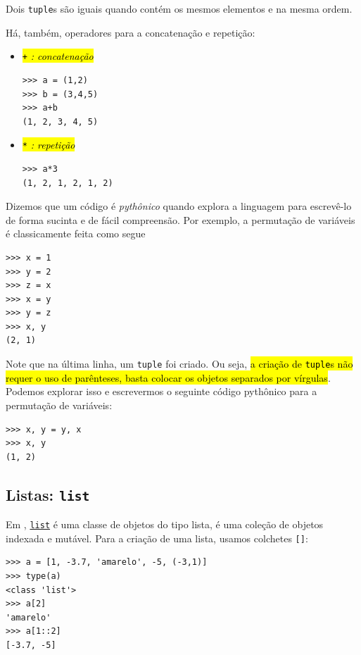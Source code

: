 \begin{obs}
  Dois \lstinline+tuple+s são iguais quando contém os mesmos elementos e na mesma ordem.
\end{obs}

Há, também, operadores para a concatenação e repetição:
\begin{itemize}
\item \hl{{\lstinline!+!} \emph{: concatenação}}

\begin{lstlisting}
>>> a = (1,2)
>>> b = (3,4,5)
>>> a+b
(1, 2, 3, 4, 5)
\end{lstlisting}

\item \hl{{\lstinline!*!} \emph{: repetição}}

\begin{lstlisting}
>>> a*3
(1, 2, 1, 2, 1, 2)
\end{lstlisting}
\end{itemize}

\begin{obs}
  Dizemos que um código é \emph{pythônico} quando explora a linguagem para escrevê-lo de forma sucinta e de fácil compreensão. Por exemplo, a permutação de variáveis é classicamente feita como segue
\begin{lstlisting}
>>> x = 1
>>> y = 2
>>> z = x
>>> x = y
>>> y = z
>>> x, y
(2, 1)
\end{lstlisting}
  Note que na última linha, um \lstinline+tuple+ foi criado. Ou seja, \hl{a criação de {\lstinline+tuple+}s não requer o uso de parênteses, basta colocar os objetos separados por vírgulas}. Podemos explorar isso e escrevermos o seguinte código pythônico para a permutação de variáveis:
\begin{lstlisting}
>>> x, y = y, x
>>> x, y
(1, 2)
\end{lstlisting}
\end{obs}

\subsection{Listas: \lstinline+list+}

Em {\python}, \href{https://docs.python.org/3/library/stdtypes.html#lists}{\lstinline+list+} é uma classe de objetos do tipo lista, é uma coleção de objetos indexada e mutável. Para a criação de uma lista, usamos colchetes \lstinline+[]+:
\begin{lstlisting}
>>> a = [1, -3.7, 'amarelo', -5, (-3,1)] 
>>> type(a)
<class 'list'>
>>> a[2]
'amarelo'
>>> a[1::2]
[-3.7, -5]
\end{lstlisting}

